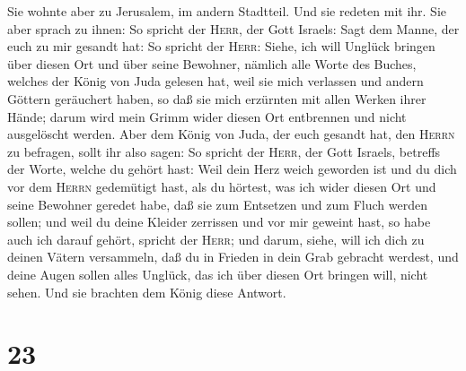 Sie wohnte aber zu Jerusalem, im andern Stadtteil. Und sie redeten mit
ihr.  Sie aber sprach zu ihnen: So spricht der
\textsc{Herr}, der Gott Israels: Sagt dem Manne, der euch zu mir gesandt
hat:  So spricht der \textsc{Herr}: Siehe, ich will
Unglück bringen über diesen Ort und über seine Bewohner, nämlich alle
Worte des Buches, welches der König von Juda gelesen hat,
 weil sie mich verlassen und andern Göttern geräuchert
haben, so daß sie mich erzürnten mit allen Werken ihrer Hände; darum
wird mein Grimm wider diesen Ort entbrennen und nicht ausgelöscht
werden.  Aber dem König von Juda, der euch gesandt hat,
den \textsc{Herrn} zu befragen, sollt ihr also sagen: So spricht der
\textsc{Herr}, der Gott Israels, betreffs der Worte, welche du gehört
hast:  Weil dein Herz weich geworden ist und du dich vor
dem \textsc{Herrn} gedemütigt hast, als du hörtest, was ich wider diesen
Ort und seine Bewohner geredet habe, daß sie zum Entsetzen und zum Fluch
werden sollen; und weil du deine Kleider zerrissen und vor mir geweint
hast, so habe auch ich darauf gehört, spricht der \textsc{Herr};
 und darum, siehe, will ich dich zu deinen Vätern
versammeln, daß du in Frieden in dein Grab gebracht werdest, und deine
Augen sollen alles Unglück, das ich über diesen Ort bringen will, nicht
sehen. Und sie brachten dem König diese Antwort.

\hypertarget{section-22}{%
\section{23}\label{section-22}}

